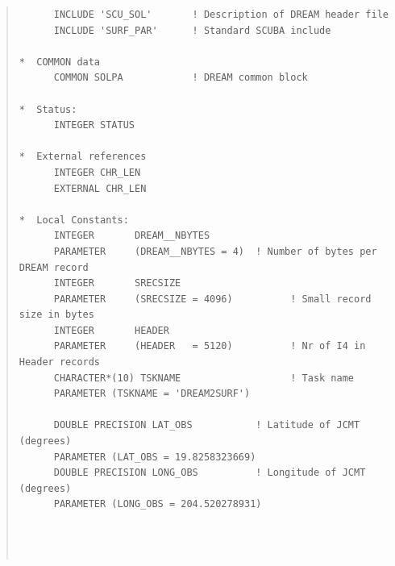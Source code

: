 \documentclass[twoside,11pt]{article}
\newenvironment{myquote}{\begin{quote}\begin{small}}{\end{small}\end{quote}}
\renewcommand{\_}{\texttt{\symbol{95}}}
\begin{document}
\begin{myquote}
\begin{verbatim}
      INCLUDE 'SCU_SOL'       ! Description of DREAM header file
      INCLUDE 'SURF_PAR'      ! Standard SCUBA include

*  COMMON data
      COMMON SOLPA            ! DREAM common block

*  Status:
      INTEGER STATUS

*  External references
      INTEGER CHR_LEN
      EXTERNAL CHR_LEN

*  Local Constants:
      INTEGER       DREAM__NBYTES
      PARAMETER     (DREAM__NBYTES = 4)  ! Number of bytes per DREAM record
      INTEGER       SRECSIZE                 
      PARAMETER     (SRECSIZE = 4096)          ! Small record size in bytes
      INTEGER       HEADER
      PARAMETER     (HEADER   = 5120)          ! Nr of I4 in Header records
      CHARACTER*(10) TSKNAME                   ! Task name
      PARAMETER (TSKNAME = 'DREAM2SURF')

      DOUBLE PRECISION LAT_OBS           ! Latitude of JCMT (degrees)
      PARAMETER (LAT_OBS = 19.8258323669)
      DOUBLE PRECISION LONG_OBS          ! Longitude of JCMT (degrees)
      PARAMETER (LONG_OBS = 204.520278931)
       



\end{verbatim}
\end{myquote}
\end{document}
